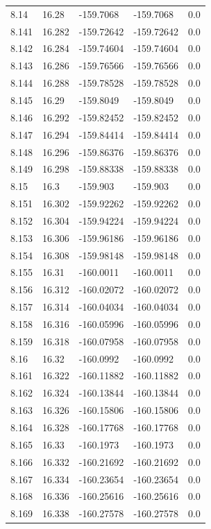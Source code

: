 \begin{tabular}{lllll}
8.14 & 16.28 & -159.7068 & -159.7068 & 0.0 \\
8.141 & 16.282 & -159.72642 & -159.72642 & 0.0 \\
8.142 & 16.284 & -159.74604 & -159.74604 & 0.0 \\
8.143 & 16.286 & -159.76566 & -159.76566 & 0.0 \\
8.144 & 16.288 & -159.78528 & -159.78528 & 0.0 \\
8.145 & 16.29 & -159.8049 & -159.8049 & 0.0 \\
8.146 & 16.292 & -159.82452 & -159.82452 & 0.0 \\
8.147 & 16.294 & -159.84414 & -159.84414 & 0.0 \\
8.148 & 16.296 & -159.86376 & -159.86376 & 0.0 \\
8.149 & 16.298 & -159.88338 & -159.88338 & 0.0 \\
8.15 & 16.3 & -159.903 & -159.903 & 0.0 \\
8.151 & 16.302 & -159.92262 & -159.92262 & 0.0 \\
8.152 & 16.304 & -159.94224 & -159.94224 & 0.0 \\
8.153 & 16.306 & -159.96186 & -159.96186 & 0.0 \\
8.154 & 16.308 & -159.98148 & -159.98148 & 0.0 \\
8.155 & 16.31 & -160.0011 & -160.0011 & 0.0 \\
8.156 & 16.312 & -160.02072 & -160.02072 & 0.0 \\
8.157 & 16.314 & -160.04034 & -160.04034 & 0.0 \\
8.158 & 16.316 & -160.05996 & -160.05996 & 0.0 \\
8.159 & 16.318 & -160.07958 & -160.07958 & 0.0 \\
8.16 & 16.32 & -160.0992 & -160.0992 & 0.0 \\
8.161 & 16.322 & -160.11882 & -160.11882 & 0.0 \\
8.162 & 16.324 & -160.13844 & -160.13844 & 0.0 \\
8.163 & 16.326 & -160.15806 & -160.15806 & 0.0 \\
8.164 & 16.328 & -160.17768 & -160.17768 & 0.0 \\
8.165 & 16.33 & -160.1973 & -160.1973 & 0.0 \\
8.166 & 16.332 & -160.21692 & -160.21692 & 0.0 \\
8.167 & 16.334 & -160.23654 & -160.23654 & 0.0 \\
8.168 & 16.336 & -160.25616 & -160.25616 & 0.0 \\
8.169 & 16.338 & -160.27578 & -160.27578 & 0.0 \\

\end{tabular}
